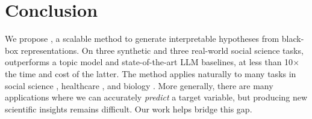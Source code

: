 \section{Conclusion}

We propose \ourmethod, a scalable method to generate interpretable hypotheses from black-box representations.
On three synthetic and three real-world social science tasks, \ourmethod outperforms a topic model and state-of-the-art LLM baselines, at less than 10$\times$ the time and cost of the latter. The method applies naturally to many tasks in social science \citep{ziems_can_2024}, healthcare \citep{hsu_clinical_2023, robitschek_large_2025, pierson_using_2025}, and biology \citep{vig_bertology_2021}.
More generally, there are many applications where we can accurately \textit{predict} a target variable, but producing new scientific insights remains difficult. Our work helps bridge this gap.

    

